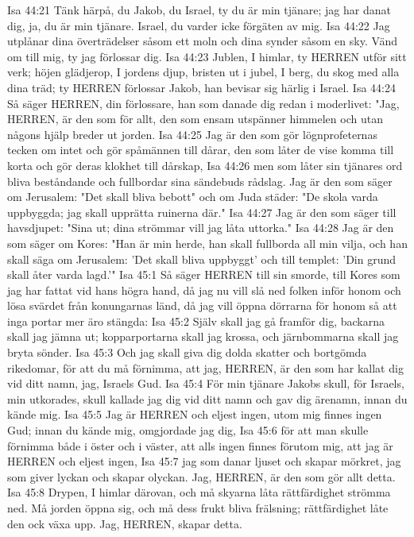 Isa 44:21  Tänk härpå, du Jakob, du Israel, ty du är min tjänare; jag har danat dig, ja, du är min tjänare. Israel, du varder icke förgäten av mig.
Isa 44:22  Jag utplånar dina överträdelser såsom ett moln och dina synder såsom en sky. Vänd om till mig, ty jag förlossar dig.
Isa 44:23  Jublen, I himlar, ty HERREN utför sitt verk; höjen glädjerop, I jordens djup, bristen ut i jubel, I berg, du skog med alla dina träd; ty HERREN förlossar Jakob, han bevisar sig härlig i Israel.
Isa 44:24  Så säger HERREN, din förlossare, han som danade dig redan i moderlivet: "Jag, HERREN, är den som för allt, den som ensam utspänner himmelen och utan någons hjälp breder ut jorden.
Isa 44:25  Jag är den som gör lögnprofeternas tecken om intet och gör spåmännen till dårar, den som låter de vise komma till korta och gör deras klokhet till dårskap,
Isa 44:26  men som låter sin tjänares ord bliva beståndande och fullbordar sina sändebuds rådslag. Jag är den som säger om Jerusalem: "Det skall bliva bebott" och om Juda städer: "De skola varda uppbyggda; jag skall upprätta ruinerna där."
Isa 44:27  Jag är den som säger till havsdjupet: "Sina ut; dina strömmar vill jag låta uttorka."
Isa 44:28  Jag är den som säger om Kores: "Han är min herde, han skall fullborda all min vilja, och han skall säga om Jerusalem: 'Det skall bliva uppbyggt' och till templet: 'Din grund skall åter varda lagd.'"
Isa 45:1  Så säger HERREN till sin smorde, till Kores som jag har fattat vid hans högra hand, då jag nu vill slå ned folken inför honom och lösa svärdet från konungarnas länd, då jag vill öppna dörrarna för honom så att inga portar mer äro stängda:
Isa 45:2  Själv skall jag gå framför dig, backarna skall jag jämna ut; kopparportarna skall jag krossa, och järnbommarna skall jag bryta sönder.
Isa 45:3  Och jag skall giva dig dolda skatter och bortgömda rikedomar, för att du må förnimma, att jag, HERREN, är den som har kallat dig vid ditt namn, jag, Israels Gud.
Isa 45:4  För min tjänare Jakobs skull, för Israels, min utkorades, skull kallade jag dig vid ditt namn och gav dig ärenamn, innan du kände mig.
Isa 45:5  Jag är HERREN och eljest ingen, utom mig finnes ingen Gud; innan du kände mig, omgjordade jag dig,
Isa 45:6  för att man skulle förnimma både i öster och i väster, att alls ingen finnes förutom mig, att jag är HERREN och eljest ingen,
Isa 45:7  jag som danar ljuset och skapar mörkret, jag som giver lyckan och skapar olyckan. Jag, HERREN, är den som gör allt detta.
Isa 45:8  Drypen, I himlar därovan, och må skyarna låta rättfärdighet strömma ned. Må jorden öppna sig, och må dess frukt bliva frälsning; rättfärdighet låte den ock växa upp. Jag, HERREN, skapar detta.
